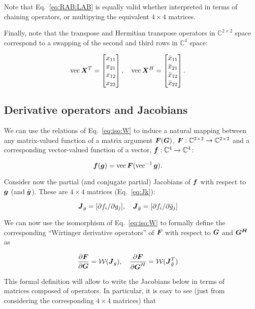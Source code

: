 \documentclass[useAMS,usenatbib]{mn2e}
\newcommand{\COMPLEX}{\mathbb{C}}
\newcommand{\mat}[1]{{\bmath{#1}}}
\newcommand{\JJ}{\mat{J}} %
\begin{document}
Note that Eq.~\ref{eq:RAB:LAB} is equally valid whether interpreted in terms of chaining operators, or multipying 
the equivalent $4\times4$ matrices.

Finally, note that the transpose and Hermitian transpose operators in $\COMPLEX^{2\times2}$ space correspond to a swapping
of the second and third rows in $\COMPLEX^4$ space:

\begin{equation}
\label{eq:vec:XH}
\VEC{\mat{X}^T} = \Matrix{c}{x_{11}\\x_{21}\\x_{12}\\x_{22}},~~~
\VEC{\mat{X}^H} = \Matrix{c}{\bar{x}_{11}\\\bar{x}_{21}\\\bar{x}_{12}\\\bar{x}_{22}}.
\end{equation}

\subsection{Derivative operators and Jacobians}

We can use the relations of Eq.~\ref{eq:iso:W} to induce a natural mapping between any matrix-valued function of a 
matrix argument $\mat{F}(\mat{G})$, $\mat{F}:\COMPLEX^{2\times2}\to\COMPLEX^{2\times2}$ and a corresponding 
vector-valued function of a vector, $\bmath{f}:\COMPLEX^4\to\COMPLEX^4$:

\[
\bmath{f}(\bmath{g}) = \VEC{\mat{F}(\VECINV{\bmath{g}})}.
\]

Consider now the partial (and conjugate partial) Jacobians of $\bmath{f}$ with respect to $\bmath{g}$ 
(and $\bar{\bmath{g}}$). These are $4\times4$ matrices (Eq.~\ref{eq:Jk}):

\[
\JJ_g = [ \partial f_i / \partial g_j ],~~~\JJ_{\bar{g}} = [ \partial f_i / \partial \bar{g}_j ]
\]

We can now use the isomorphism of Eq.~\ref{eq:iso:W} to formally define the corresponding ``Wirtinger derivative operators'' 
of $\mat{F}$ with respect to $\mat{G}$ and $\mat{G^H}$ as

\begin{equation}
\label{eq:def:dF:dG}
\frac{\partial\mat{F}}{\partial{\mat{G}}} = \mathcal{W}(\JJ_g),~~~
\frac{\partial\mat{F}}{\partial{\mat{G}^H}} = \mathcal{W}(\JJ_{\bar{g}}^T)
\end{equation}

This formal definition will allow to write the Jacobians below in terms of matrices composed of operators. 
In particular, it is easy to see (just from considering the corresponding $4\times4$ matrices) that
\end{document}
